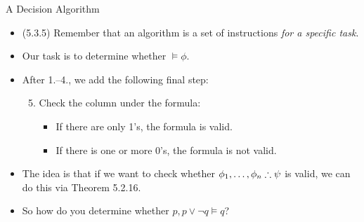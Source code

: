 \begin{frame}{A Decision Algorithm}

	\begin{itemize}

	\item (5.3.5) Remember that an algorithm is a set of instructions \emph{for a specific task}.
	
	\item Our task is to determine whether $\vDash\phi$.

	\item After 1.--4., we add the following final step: 
		\begin{enumerate}[1.]
		\setcounter{enumii}{4}
		
			\item Check the column under the formula:
			
				\begin{itemize}
				
					\item If there are only 1's, the formula is valid.
					\item If there is one or more 0's, the formula is not valid.
				\end{itemize}
		\end{enumerate}

	\item The idea is that if we want to check whether $\phi_1, \mathellipsis,\phi_n\therefore\psi$ is valid, we can do this via Theorem 5.2.16.
	
	\item So how do you determine whether $p, p\lor \neg q\vDash q$?
	
	\end{itemize}

\end{frame}

